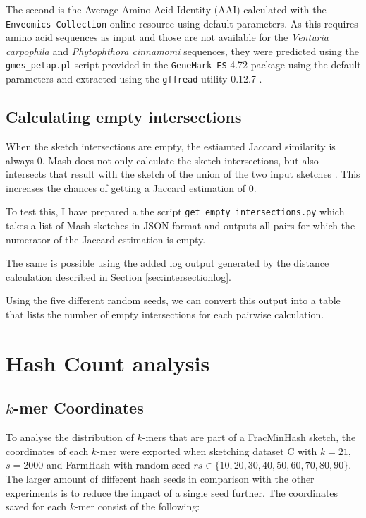 The second is the Average Amino Acid Identity (AAI) calculated with the
\texttt{Enveomics Collection} online resource
\cite{rodriguez-rEnveomicsCollectionToolbox2016} using default parameters. As
this requires amino acid sequences as input and those are not available for the
\textit{Venturia carpophila} and \textit{Phytophthora cinnamomi} sequences, they
were predicted using the \texttt{gmes\_petap.pl} script provided in the
\texttt{GeneMark ES} 4.72 package \cite{lomsadzeGeneIdentificationNovel2005}
using the default parameters and extracted using the \texttt{gffread} utility
0.12.7 \cite{perteaGFFUtilitiesGffRead2020}.


\subsection*{Calculating empty intersections}
When the sketch intersections are empty, the estiamted Jaccard similarity is
always 0. Mash does not only calculate the sketch intersections, but also
intersects that result with the sketch of the union of the two input sketches
\cite{ondovMashFastGenome2016}. This increases the chances of getting a Jaccard
estimation of 0. 

To test this, I have prepared a the script \texttt{get\_empty\_intersections.py}
which takes a list of Mash sketches in JSON format and outputs all pairs for
which the numerator of the Jaccard estimation is empty.

The same is possible using the added log output generated by the distance
calculation described in Section \ref{sec:intersectionlog}.

Using the five different random seeds, we can convert this output into a table
that lists the number of empty intersections for each pairwise calculation. 



\section{Hash Count analysis}
\subsection*{$k$-mer Coordinates}
To analyse the distribution of $k$-mers that are part of a FracMinHash sketch,
the coordinates of each $k$-mer were exported when sketching dataset C with
$k=21$, $s=2000$ and FarmHash with random seed $rs \in \{10, 20, 30, 40, 50, 60,
70, 80, 90\}$. The larger amount of different hash seeds in comparison with the
other experiments is to reduce the impact of a single seed further. 
The coordinates saved for each $k$-mer consist of the following:

